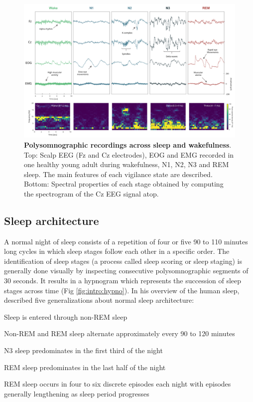 \begin{figure}
	\centering
	\includegraphics[width=\linewidth, height=0.8\textheight, keepaspectratio]{Fig/Intro/Intro_Sleep_Stages_PSD/Intro_Sleep_Stages_PSD.png}
	\captionsetup{width=0.9\textheight, boxcolor=white}
	\caption[Polysomnographic recordings across sleep and wakefulness]{\textbf{Polysomnographic recordings across sleep and wakefulness}. Top: Scalp EEG (Fz and Cz electrodes), EOG and EMG recorded in one healthy young adult during wakefulness, N1, N2, N3 and REM sleep. The main features of each vigilance state are described. Bottom: Spectral properties of each stage obtained by computing the spectrogram of the Cz EEG signal atop.}
	\label{fig:intro:sleep_stage}
\end{figure}

\subsection{Sleep architecture}
\label{sec:dream-research:sleep:architecture}

A normal night of sleep consists of a repetition of four or five 90 to 110 minutes long cycles in which sleep stages follow each other in a specific order. The identification of sleep stages (a process called sleep scoring or sleep staging) is generally done visually by inspecting consecutive polysomnographic segments of 30 seconds. It results in a hypnogram which represents the succession of sleep stages across time (Fig \ref{fig:intro:hypno}). In his overview of the human sleep, \citet{hirshkowitz_normal_2004} described five generalizations about normal sleep architecture:

\begin{my_list_num}
    \item Sleep is entered through non-REM sleep
    \item Non-REM and REM sleep alternate approximately every 90 to 120 minutes
	\item N3 sleep predominates in the first third of the night
	\item REM sleep predominates in the last half of the night
	\item REM sleep occurs in four to six discrete episodes each night with episodes generally lengthening as sleep period progresses
\end{my_list_num}

